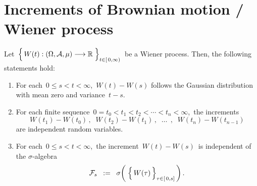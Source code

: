 

\section{Increments of Brownian motion / Wiener process}
\setcounter{theorem}{0}
\setcounter{equation}{0}


\renewcommand{\theenumi}{\roman{enumi}}
\renewcommand{\labelenumi}{\textnormal{(\theenumi)}$\;\;$}


\begin{proposition}
\label{WienerProcessIncrements}
\mbox{}
\vskip 0.2cm
\noindent
Let
\,$\left\{\,\overset{{\color{white}.}}{W}(t) : (\Omega,\mathcal{A},\mu) \longrightarrow \Re \;\right\}_{t \in[\,0,\infty)}$\,
be a Wiener process.
Then, the following statements hold:
\begin{enumerate}
\item
	For each \,$0 \leq s < t < \infty$,\,
	$W(t) - W(s)$ follows the Gaussian distribution with mean zero and variance \,$t-s$.	
\item
	For each finite sequence \,$0 = t_{0} < t_{1} < t_{2} < \cdots < t_{n} < \infty$,\,
	the increments
	\begin{equation*}
	W(t_{1}) - W(t_{0})\,,\;\;
	W(t_{2}) - W(t_{1})\,,\;\;
	\ldots\;\,,\;\;
	W(t_{n}) - W(t_{n-1})
	\end{equation*}
	are independent random variables.
\item
	For each \,$0 \leq s < t < \infty$,\,
	the increment \,$W(t) - W(s)$\,
	is independent of the $\sigma$-algebra
	\begin{equation*}
	\mathcal{F}_{s}
	\;\; := \;\;
		\sigma\!\left(\;\left\{\,
			\overset{{\color{white}.}}{W}(\tau)
			\,\right\}_{\tau \in [\,0,s]}\,\right).
	\end{equation*}
\end{enumerate}
\end{proposition}
\proof
